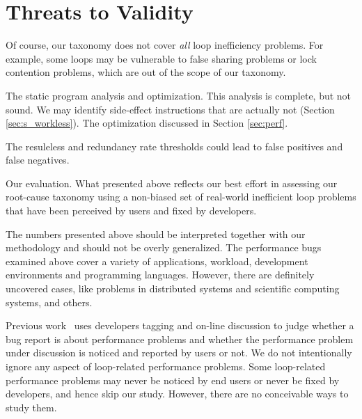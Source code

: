 \section{Threats to Validity}
\label{sec:threats}

Of course, our taxonomy does not cover \emph{all} loop inefficiency problems.
For example, some loops may be vulnerable to false sharing problems or lock
contention problems, which are out of the scope of our taxonomy. 


The static program analysis and optimization.
This analysis is complete, but not sound. We may identify side-effect
instructions that are actually not (Section \ref{sec:s_workless}).
The optimization discussed in Section \ref{sec:perf}.

The resuleless and redundancy rate thresholds could lead to false positives
and false negatives.

Our evaluation.
What presented above reflects our best effort in assessing our root-cause
taxonomy using a non-biased set of real-world inefficient loop problems that
have been perceived by users and fixed by developers.

The numbers presented above should be interpreted together with our methodology
and should not be overly generalized.
The performance bugs examined above cover a variety of applications, workload, 
development environments and programming languages. 
However, there are definitely uncovered cases, like problems in distributed systems
and scientific computing systems, and others. 

Previous work~\cite{PerfBug, SongOOPSLA2014} uses developers tagging and
on-line discussion to judge whether a bug report is about
performance problems and whether 
the performance problem under discussion is noticed and reported by users
or not.
We do not intentionally ignore any aspect of loop-related performance problems. 
Some loop-related performance problems may never be noticed by end users
or never be fixed by developers, and hence skip our study. However,
there are no conceivable ways to study them. 


